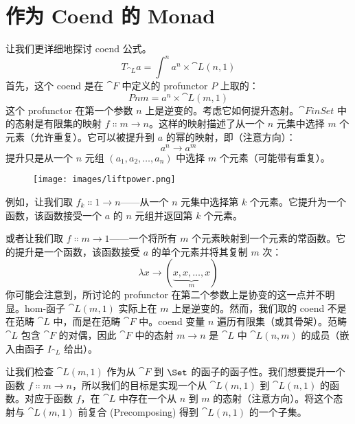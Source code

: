 \section{作为 Coend 的 Monad}

让我们更详细地探讨 coend 公式。
\[T_{\cat{L}} a = \int^n a^n \times \cat{L}(n, 1)\]
首先，这个 coend 是在 $\cat{F}$ 中定义的 profunctor $P$ 上取的：
\[P n m = a^n \times \cat{L}(m, 1)\]
这个 profunctor 在第一个参数 $n$ 上是逆变的。考虑它如何提升态射。$\cat{FinSet}$ 中的态射是有限集的映射 $f \Colon m \to n$。这样的映射描述了从一个 $n$ 元集中选择 $m$ 个元素（允许重复）。它可以被提升到 $a$ 的幂的映射，即（注意方向）：
\[a^n \to a^m\]
提升只是从一个 $n$ 元组 $(a_1, a_2, \ldots{}, a_n)$ 中选择 $m$ 个元素（可能带有重复）。

\begin{figure}[H]
  \centering
  \texttt{[image: images/liftpower.png]}
\end{figure}

\noindent
例如，让我们取 $f_k \Colon 1 \to n$——从一个 $n$ 元集中选择第 $k$ 个元素。它提升为一个函数，该函数接受一个 $a$ 的 $n$ 元组并返回第 $k$ 个元素。

或者让我们取 $f \Colon m \to 1$——一个将所有 $m$ 个元素映射到一个元素的常函数。它的提升是一个函数，该函数接受 $a$ 的单个元素并将其复制 $m$ 次：
\[\lambda{}x \to (\underbrace{x, x, \ldots{}, x}_{m})\]
你可能会注意到，所讨论的 profunctor 在第二个参数上是协变的这一点并不明显。hom-函子 $\cat{L}(m, 1)$ 实际上在 $m$ 上是逆变的。然而，我们取的 coend 不是在范畴 $\cat{L}$ 中，而是在范畴 $\cat{F}$ 中。coend 变量 $n$ 遍历有限集（或其骨架）。范畴 $\cat{L}$ 包含 $\cat{F}$ 的对偶，因此 $\cat{F}$ 中的态射 $m \to n$ 是 $\cat{L}$ 中 $\cat{L}(n, m)$ 的成员（嵌入由函子 $I_{\cat{L}}$ 给出）。

让我们检查 $\cat{L}(m, 1)$ 作为从 $\cat{F}$ 到 $\Set$ 的函子的函子性。我们想要提升一个函数 $f \Colon m \to n$，所以我们的目标是实现一个从 $\cat{L}(m, 1)$ 到 $\cat{L}(n, 1)$ 的函数。对应于函数 $f$，在 $\cat{L}$ 中存在一个从 $n$ 到 $m$ 的态射（注意方向）。将这个态射与 $\cat{L}(m, 1)$ 前复合 (Precomposing) 得到 $\cat{L}(n, 1)$ 的一个子集。

\begin{figure}[H]
  \centering
\end{figure}

